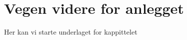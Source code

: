 \section{Vegen videre for anlegget}
\thispagestyle{fancy}
Her kan vi starte underlaget for kappittelet